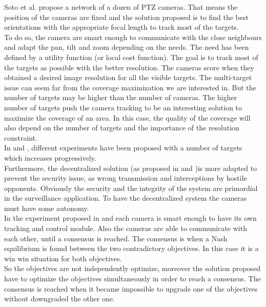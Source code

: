 Soto et al. \cite{12*soto2009} propose a network of a dozen of PTZ cameras. That means the position of the cameras are fixed and the solution proposed is to find the best orientations with the appropriate focal length to track most of the targets.  \\
 To do so, the camera are smart enough to communicate with the close neighbours and adapt the pan, tilt and zoom depending on the needs.
The need has been defined by a utility function (or local cost function). The goal is to track most of the targets as possible with the better resolution. The cameras score when they obtained a desired image resolution for all the visible targets.
 The multi-target issue can seem far from the coverage maximization we are interested in. But the number of targets may be higher than the number of cameras. The higher number of targets push the camera tracking to be an interesting solution to maximize the coverage of an area. In this case, the quality of the coverage will also depend on the number of targets and the importance of the resolution constraint.  \\
	 In \cite{18*ding2012} and \cite{25*song2008}, different experiments have been proposed with a number of targets which increases progressively.\\
	  Furthermore, the decentralized solution (as proposed in \cite{25*song2008} and \cite{18*ding2012})is more adapted to prevent the security issue, as wrong transmission and interceptions by hostile opponents.  Obviously the security and the integrity of the system are primordial in the surveillance application. %
To have the decentralized system the cameras must have some autonomy. \\
In the experiment proposed in \cite{12*soto2009} and \cite{18*ding2012,25*song2008} each camera is smart enough to have its own tracking and control module. Also the cameras are able to communicate with each other, until a consensus is reached. The consensus is when a Nash equilibrium is found between the two contradictory objectives. In this case it is a win win situation for both objectives.\\
So the objectives are not independently optimize, moreover the solution proposed have to optimize the objectives  simultaneously in order to reach a consensus. The consensus is reached when it became impossible to upgrade one of the objectives without downgraded the other one.\\
